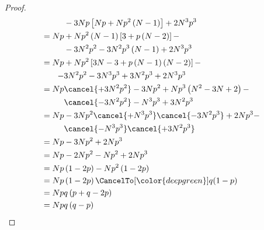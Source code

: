 \begin{prob}
\begin{sol}
\begin{proof}
\begin{align}
       		   &-3Np\left[Np+Np^2\left(N-1\right)\right]+2N^3p^3\nonumber \\
		=Np&+Np^2\left(N-1\right)\left[3+p\left(N-2\right)\right]-\nonumber \\
       		   &-3N^2p^2-3N^2p^3\left(N-1\right)+2N^3p^3\nonumber \\
		=Np&+Np^2\left[3N-3+p\left(N-1\right)\left(N-2\right)\right]-\nonumber \\
			  -&3N^2p^2-3N^3p^3+3N^2p^3+2N^3p^3\nonumber \\
		=Np&\cancel{+3N^2p^2}-3Np^2+Np^3\left(N^2-3N+2\right)-\nonumber \\
               &\cancel{-3N^2p^2}-N^3p^3+3N^2p^3\nonumber \\
		=Np&-3Np^2\cancel{+N^3p^3}\cancel{-3N^2p^3}+2Np^3-\nonumber \\
               &\cancel{-N^3p^3}\cancel{+3N^2p^3}\nonumber \\
		=Np&-3Np^2+2Np^3\nonumber \\
		=Np&-2Np^2-Np^2+2Np^3\nonumber \\
		=Np&\left(1-2p\right)-Np^2\left(1-2p\right)\nonumber \\
		=Np&\left(1-2p\right)\CancelTo[\color{deepgreen}]{q}{\left(1-p\right)}\nonumber \\
		=Np&q\left(p+q-2p\right)\nonumber \\
		=Np&q\left(q-p\right)
	\end{align}
\end{proof}
\end{sol}
\end{prob}
\newpage
{}
